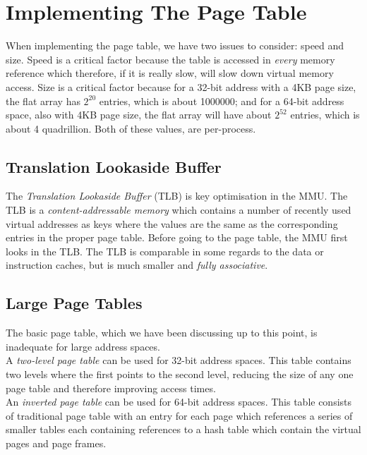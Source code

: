 \section{Implementing The Page Table}
When implementing the page table, we have two issues to consider: speed and size. Speed is a critical factor because the table is accessed in \textit{every} memory reference which therefore, if it is really slow, will slow down virtual memory access. Size is a critical factor because for a 32-bit address with a 4KB page size, the flat array has $2^{20}$ entries, which is about 1000000; and for a 64-bit address space, also with 4KB page size, the flat array will have about $2^{52}$ entries, which is about 4 quadrillion. Both of these values, are per-process.

\subsection{Translation Lookaside Buffer}
The \textit{Translation Lookaside Buffer} (TLB) is key optimisation in the MMU. The TLB is a \textit{content-addressable memory} which contains a number of recently used virtual addresses as keys where the values are the same as the corresponding entries in the proper page table. Before going to the page table, the MMU first looks in the TLB. The TLB is comparable in some regards to the data or instruction caches, but is much smaller and \textit{fully associative}.

\subsection{Large Page Tables}
The basic page table, which we have been discussing up to this point, is inadequate for large address spaces.\\

A \textit{two-level page table} can be used for 32-bit address spaces. This table contains two levels where the first points to the second level, reducing the size of any one page table and therefore improving access times.\\

An \textit{inverted page table} can be used for 64-bit address spaces. This table consists of traditional page table with an entry for each page which references a series of smaller tables each containing references to a hash table which contain the virtual pages and page frames. 